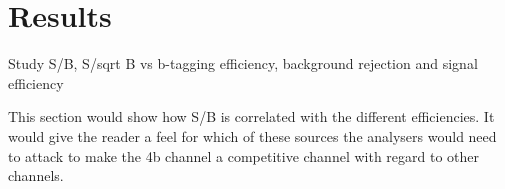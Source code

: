 
\section{Results}

\label{sec:results}

Study S/B, S/sqrt B vs b-tagging efficiency, background rejection and signal efficiency

This section would show how S/B is correlated with the different efficiencies. It would give the reader a feel for which of these sources the analysers would need to attack to make the 4b channel a competitive channel with regard to other channels.
